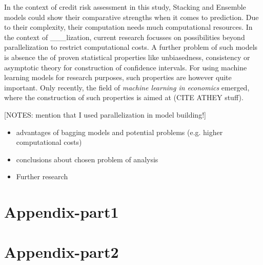 \documentclass[12pt]{article}
\begin{document}
In the context of credit risk assessment in this study, Stacking and Ensemble models could show their comparative strengths when it comes to prediction. Due to their complexity, their computation needs much computational resources. In the context of ___lization, current research focusses on possibilities beyond parallelization to restrict computational costs. A further problem of such models is absence the of proven statistical properties like unbiasedness, consistency or asymptotic theory for construction of confidence intervals. For using machine learning models for research purposes, such properties are however quite important. Only recently, the field of \textit{machine learning in economics} emerged, where the construction of such properties is aimed at (CITE ATHEY stuff).

[NOTES: mention that I used parallelization in model building!]
\begin{itemize}
\item advantages of bagging models and potential problems (e.g. higher computational costs)
\item conclusions about chosen problem of analysis
\item Further research	
\end{itemize}






\appendix
\section{Appendix-part1}

\section{Appendix-part2}

\clearpage


\end{document}
